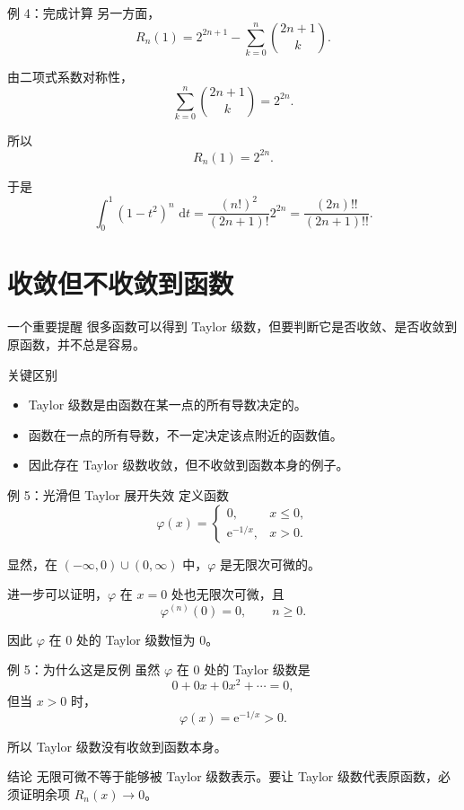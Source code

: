 \documentclass[aspectratio=169,11pt]{ctexbeamer}
\newcommand{\dd}{\,\mathrm{d}}
\newcommand{\ee}{\mathrm{e}}
\begin{document}
\begin{frame}{例 4：完成计算}
\small
另一方面，
\[
  R_n(1)
  =
  2^{2n+1}-\sum_{k=0}^n\binom{2n+1}{k}.
\]

由二项式系数对称性，
\[
  \sum_{k=0}^n\binom{2n+1}{k}=2^{2n}.
\]

所以
\[
  R_n(1)=2^{2n}.
\]

于是
\[
  \int_0^1(1-t^2)^n\,\dd t
  =
  \frac{(n!)^2}{(2n+1)!}2^{2n}
  =
  \frac{(2n)!!}{(2n+1)!!}.
\]
\end{frame}

\section{收敛但不收敛到函数}

\begin{frame}{一个重要提醒}
\small
很多函数可以得到 Taylor 级数，但要判断它是否收敛、是否收敛到原函数，并不总是容易。

\begin{block}{关键区别}
\begin{itemize}
  \item Taylor 级数是由函数在某一点的所有导数决定的。
  \item 函数在一点的所有导数，不一定决定该点附近的函数值。
  \item 因此存在 Taylor 级数收敛，但不收敛到函数本身的例子。
\end{itemize}
\end{block}
\end{frame}

\begin{frame}{例 5：光滑但 Taylor 展开失效}
\small
定义函数
\[
\varphi(x)=
\begin{cases}
0,&x\le0,\\
\ee^{-1/x},&x>0.
\end{cases}
\]

显然，在 $(-\infty,0)\cup(0,\infty)$ 中，$\varphi$ 是无限次可微的。

进一步可以证明，$\varphi$ 在 $x=0$ 处也无限次可微，且
\[
  \varphi^{(n)}(0)=0,\qquad n\ge0.
\]

因此 $\varphi$ 在 $0$ 处的 Taylor 级数恒为 $0$。
\end{frame}

\begin{frame}{例 5：为什么这是反例}
\small
虽然 $\varphi$ 在 $0$ 处的 Taylor 级数是
\[
  0+0x+0x^2+\cdots=0,
\]
但当 $x>0$ 时，
\[
  \varphi(x)=\ee^{-1/x}>0.
\]

所以 Taylor 级数没有收敛到函数本身。

\begin{block}{结论}
无限可微不等于能够被 Taylor 级数表示。要让 Taylor 级数代表原函数，必须证明余项 $R_n(x)\to0$。
\end{block}
\end{frame}
\end{document}
